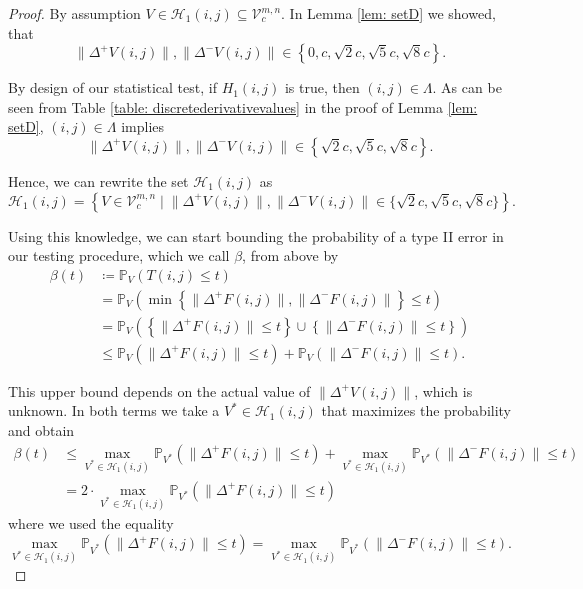 \documentclass[a4paper,12pt]{article}
\newcommand{\norm}[1]{\lVert#1\rVert}
\theoremstyle{plain}
\theoremstyle{definition}
\begin{document}
\begin{proof}
	By assumption $V \in \mathcal{H}_1(i, j) \subseteq \mathcal{V}_c^{m, n}$. In Lemma \ref{lem: setD} we showed, that
	\begin{equation*}
		\norm{\Delta^+ V(i, j)}, \norm{\Delta^- V(i, j)} \in \left\{ 0, c, \sqrt{2} c, \sqrt{5} c, \sqrt{8} c \right\}.
	\end{equation*}
	
	By design of our statistical test, if $H_1(i, j)$ is true, then $(i, j) \in \varLambda$. As can be seen from Table \ref{table: discretederivativevalues} in the proof of Lemma \ref{lem: setD}, $(i, j) \in \varLambda$ implies
	\begin{equation*}
		\norm{\Delta^+ V(i, j)}, \norm{\Delta^- V(i, j)} \in \left\{ \sqrt{2} c, \sqrt{5} c, \sqrt{8} c \right\}.
	\end{equation*}
	
	Hence, we can rewrite the set $\mathcal{H}_1(i, j)$ as
	\begin{equation*}
		\mathcal{H}_1(i, j) = \left\{ V \in \mathcal{V}_c^{m, n} \mid \norm{\Delta^+ V(i, j)}, \norm{\Delta^- V(i, j)} \in \{ \sqrt{2} c, \sqrt{5} c, \sqrt{8} c \} \right\}.
	\end{equation*}
	
	Using this knowledge, we can start bounding the probability of a type II error in our testing procedure, which we call $\beta$, from above by
	\begin{align*}
		\beta(t) &\coloneqq \mathbb{P}_V\left( T(i, j) \leq t \right) \\
		&= \mathbb{P}_V\left( \min \left\{ \norm{\Delta^+ F(i, j)}, \norm{\Delta^- F(i, j)} \right\} \leq t \right) \\
		&= \mathbb{P}_V\left( \left\{ \norm{\Delta^+ F(i, j)} \leq t \right\} \cup \left\{ \norm{\Delta^- F(i, j)} \leq t \right\} \right) \\
		&\leq \mathbb{P}_V\left( \norm{\Delta^+ F(i, j)} \leq t \right) + \mathbb{P}_V\left( \norm{\Delta^- F(i, j)} \leq t \right).
	\end{align*}
	
	This upper bound depends on the actual value of $\norm{\Delta^+ V(i, j)}$, which is unknown. In both terms we take a $V^* \in \mathcal{H}_1(i, j)$ that maximizes the probability and obtain
	\begin{align*}
		\beta(t) &\leq \max_{V^* \in \mathcal{H}_1(i, j)} \mathbb{P}_{V^*}\left( \norm{\Delta^+ F(i, j)} \leq t \right) + \max_{V^* \in \mathcal{H}_1(i, j)} \mathbb{P}_{V^*}\left( \norm{\Delta^- F(i, j)} \leq t \right) \\
		&= 2 \cdot \max_{V^* \in \mathcal{H}_1(i, j)} \mathbb{P}_{V^*}\left( \norm{\Delta^+ F(i, j)} \leq t \right)
	\end{align*}
	where we used the equality
	\begin{equation*}
		\max_{V^* \in \mathcal{H}_1(i, j)} \mathbb{P}_{V^*}\left( \norm{\Delta^+ F(i, j)} \leq t \right) = \max_{V^* \in \mathcal{H}_1(i, j)} \mathbb{P}_{V^*}\left( \norm{\Delta^- F(i, j)} \leq t \right).
	\end{equation*}
	

\end{proof}
\end{document}
